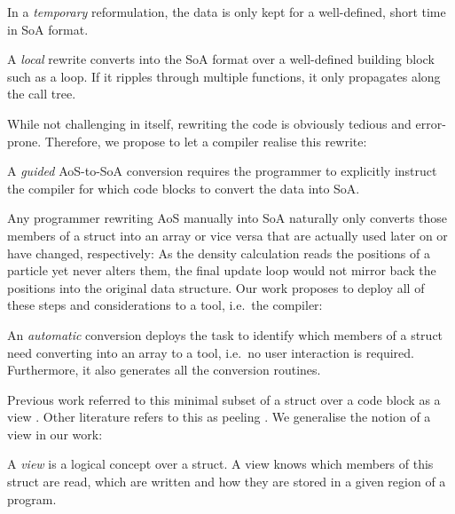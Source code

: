 \begin{concept}
  In a \emph{temporary} reformulation, the data is only kept for a well-defined, short time in SoA format.
\end{concept}

\begin{concept}
  A \emph{local} rewrite converts into the SoA format over a well-defined building block such as a loop. If it ripples through multiple functions, it only propagates along the call tree.
\end{concept}

\noindent
While not challenging in itself, rewriting the code is obviously tedious and error-prone.
Therefore, we propose to let a compiler realise this rewrite:

\begin{concept}
  A \emph{guided} AoS-to-SoA conversion requires the programmer to explicitly instruct the compiler for which code blocks to convert the data into SoA.
\end{concept}


\noindent
Any programmer rewriting AoS manually into SoA naturally only converts those members of a struct into an array or vice versa that are actually used later on or have changed, respectively:
As the density calculation reads the positions of a particle yet never alters them, the final update loop would not mirror back the positions into the original data structure.
Our work proposes to deploy all of these steps and considerations to a tool, i.e.~the compiler:

\begin{concept}
  An \emph{automatic} conversion deploys the task to identify which members of a struct need converting into an array to a tool, i.e.~no user interaction is required. Furthermore, it also generates all the conversion routines. 
\end{concept}


\noindent
Previous work referred to this minimal subset of a struct over a code block as a view \cite{Radtke:2024:AoS2SoA}.
Other literature refers to this as peeling \cite{Hundt:2006:StructureLayoutOptimisation}.
We generalise the notion of a view in our work:

\begin{concept}
 A \emph{view} is a logical concept over a struct. A view knows which members of this struct are read, which are written and how they are stored in a given region of a program.
\end{concept}

